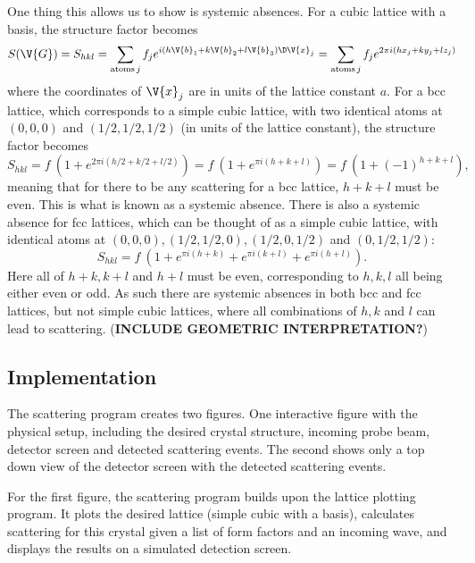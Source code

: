 \documentclass[main.tex]{subfiles}
\begin{document}
	One thing this allows us to show is systemic absences. For a cubic lattice with a basis, the structure factor becomes
	\begin{equation}\label{eq:Scat_struct_ortho}
		S(\V{G}) = S_{hkl} = \sum_{\text{atoms}\, j} f_j e^{i (h\V{b}_1 + k\V{b}_2 + l\V{b}_3) \D \V{x}_j} = \sum_{\text{atoms}\, j} f_j e^{2\pi i (hx_j + ky_j + lz_j)}
	\end{equation}
	where the coordinates of $ \V{x}_j $ are in units of the lattice constant $ a $. For a bcc lattice, which corresponds to a simple cubic lattice, with two identical atoms at $ (0,0,0) $ and $ (1/2, 1/2, 1/2) $ (in units of the lattice constant), the structure factor becomes
	\begin{equation}
		S_{hkl} = f\ (1 + e^{2\pi i (h/2 + k/2 + l/2)}) = f\ (1 + e^{\pi i (h+k+l)}) = f \ (1+ (-1)^{h+k+l}),
	\end{equation}
	meaning that for there to be any scattering for a bcc lattice, $ h+k+l $ must be even. This is what is known as a systemic absence. There is also a systemic absence for fcc lattices, which can be thought of as a simple cubic lattice, with identical atoms at $ (0,0,0), (1/2, 1/2, 0), (1/2, 0, 1/2) $ and $ (0, 1/2, 1/2) $:
	\begin{equation}
		S_{hkl} = f\ (1 + e^{\pi i (h+k)} + e^{\pi i (k+l)} + e^{\pi i (h+l)}).
	\end{equation}
	Here all of $ h+k, k+l $ and $ h+l $ must be even, corresponding to $ h,k,l $ all being either even or odd. As such there are systemic absences in both bcc and fcc lattices, but not simple cubic lattices, where all combinations of $ h,k $ and $ l $ can lead to scattering. (\textbf{INCLUDE GEOMETRIC INTERPRETATION?})
	
	\subsection{Implementation}
	The scattering program creates two figures. One interactive figure with the physical setup, including the desired crystal structure, incoming probe beam, detector screen and detected scattering events. The second shows only a top down view of the detector screen with the detected scattering events.
	
	For the first figure, the scattering program builds upon the lattice plotting program. It plots the desired lattice (simple cubic with a basis), calculates scattering for this crystal given a list of form factors and an incoming wave, and displays the results on a simulated detection screen.
	
\end{document}
